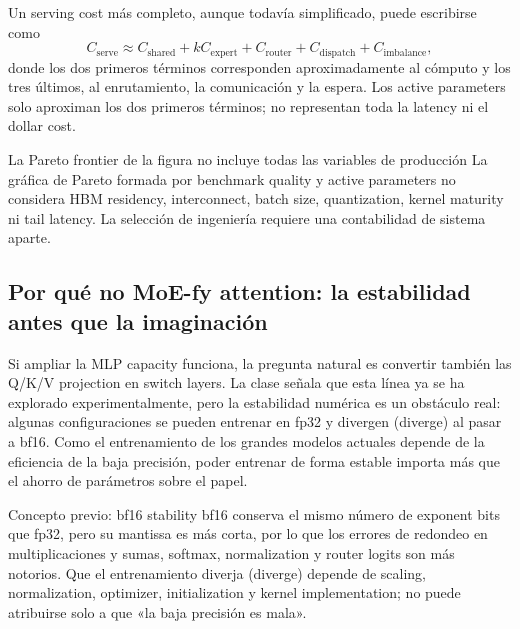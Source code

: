 
Un serving cost más completo, aunque todavía simplificado, puede escribirse como
\[
C_{\text{serve}}\approx C_{\text{shared}}+kC_{\text{expert}}+C_{\text{router}}+C_{\text{dispatch}}+C_{\text{imbalance}},
\]
donde los dos primeros términos corresponden aproximadamente al cómputo y los tres últimos, al enrutamiento, la comunicación y la espera. Los active parameters solo aproximan los dos primeros términos; no representan toda la latency ni el dollar cost.

\begin{warningbox}{La Pareto frontier de la figura no incluye todas las variables de producción}
La gráfica de Pareto formada por benchmark quality y active parameters no considera HBM residency, interconnect, batch size, quantization, kernel maturity ni tail latency. La selección de ingeniería requiere una contabilidad de sistema aparte.
\end{warningbox}


\subsection{Por qué no MoE-fy attention: la estabilidad antes que la imaginación}

Si ampliar la MLP capacity funciona, la pregunta natural es convertir también las Q/K/V projection en switch layers. La clase señala que esta línea ya se ha explorado experimentalmente, pero la estabilidad numérica es un obstáculo real: algunas configuraciones se pueden entrenar en fp32 y divergen (diverge) al pasar a bf16. Como el entrenamiento de los grandes modelos actuales depende de la eficiencia de la baja precisión, poder entrenar de forma estable importa más que el ahorro de parámetros sobre el papel.


\begin{knowledgebox}{Concepto previo: bf16 stability}
bf16 conserva el mismo número de exponent bits que fp32, pero su mantissa es más corta, por lo que los errores de redondeo en multiplicaciones y sumas, softmax, normalization y router logits son más notorios. Que el entrenamiento diverja (diverge) depende de scaling, normalization, optimizer, initialization y kernel implementation; no puede atribuirse solo a que «la baja precisión es mala».
\end{knowledgebox}

